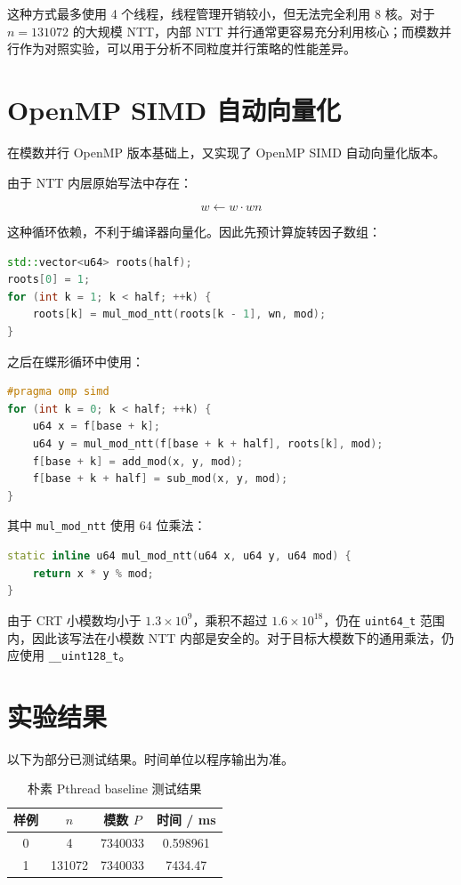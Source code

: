 \documentclass[UTF8,a4paper,12pt]{ctexart}
\begin{document}
这种方式最多使用 4 个线程，线程管理开销较小，但无法完全利用 8 核。对于 $n=131072$ 的大规模 NTT，内部 NTT 并行通常更容易充分利用核心；而模数并行作为对照实验，可以用于分析不同粒度并行策略的性能差异。

\section{OpenMP SIMD 自动向量化}

在模数并行 OpenMP 版本基础上，又实现了 OpenMP SIMD 自动向量化版本。

由于 NTT 内层原始写法中存在：

\[
w \leftarrow w\cdot wn
\]

这种循环依赖，不利于编译器向量化。因此先预计算旋转因子数组：

\begin{lstlisting}[language=C++]
std::vector<u64> roots(half);
roots[0] = 1;
for (int k = 1; k < half; ++k) {
    roots[k] = mul_mod_ntt(roots[k - 1], wn, mod);
}
\end{lstlisting}

之后在蝶形循环中使用：

\begin{lstlisting}[language=C++]
#pragma omp simd
for (int k = 0; k < half; ++k) {
    u64 x = f[base + k];
    u64 y = mul_mod_ntt(f[base + k + half], roots[k], mod);
    f[base + k] = add_mod(x, y, mod);
    f[base + k + half] = sub_mod(x, y, mod);
}
\end{lstlisting}

其中 \texttt{mul\_mod\_ntt} 使用 64 位乘法：

\begin{lstlisting}[language=C++]
static inline u64 mul_mod_ntt(u64 x, u64 y, u64 mod) {
    return x * y % mod;
}
\end{lstlisting}

由于 CRT 小模数均小于 $1.3\times 10^9$，乘积不超过 $1.6\times 10^{18}$，仍在 \texttt{uint64\_t} 范围内，因此该写法在小模数 NTT 内部是安全的。对于目标大模数下的通用乘法，仍应使用 \texttt{\_\_uint128\_t}。

\section{实验结果}

以下为部分已测试结果。时间单位以程序输出为准。

\begin{table}[h]
\centering
\caption{朴素 Pthread baseline 测试结果}
\begin{tabular}{cccc}
\toprule
样例 & $n$ & 模数 $P$ & 时间 / ms \\
\midrule
0 & 4 & 7340033 & 0.598961 \\
1 & 131072 & 7340033 & 7434.47 \\
\bottomrule
\end{tabular}
\end{table}
\end{document}
